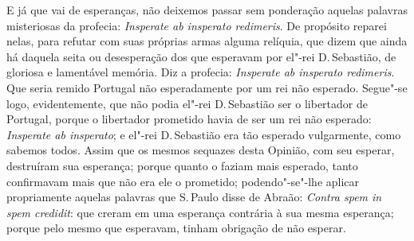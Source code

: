 E já que vai de esperanças, não deixemos passar sem ponderação aquelas
palavras misteriosas da profecia: \emph{Insperate ab insperato
redimeris}. De propósito reparei nelas, para refutar com suas próprias
armas alguma relíquia, que dizem que ainda há daquela seita ou
desesperação dos que esperavam por el"-rei D.\,Sebastião, de gloriosa e
lamentável memória. Diz a profecia: \emph{Insperate ab insperato
redimeris}. Que seria remido Portugal não esperadamente por um rei não esperado.
Segue"-se logo, evidentemente, que não podia el"-rei D.\,Sebastião ser o
libertador de Portugal, porque o libertador prometido havia de ser um
rei não esperado: \emph{Insperate ab insperato}; e el"-rei D.\,Sebastião
era tão esperado vulgarmente, como sabemos todos. Assim que os mesmos
sequazes desta Opinião, com seu esperar, destruíram sua esperança;
porque quanto o faziam mais esperado, tanto confirmavam mais que não era
ele o prometido; podendo"-se"-lhe aplicar propriamente aquelas palavras
que S.\,Paulo disse de Abraão: \emph{Contra spem in spem credidit}: que
creram em uma esperança contrária à sua mesma esperança; porque pelo mesmo que
esperavam, tinham obrigação de não esperar.

